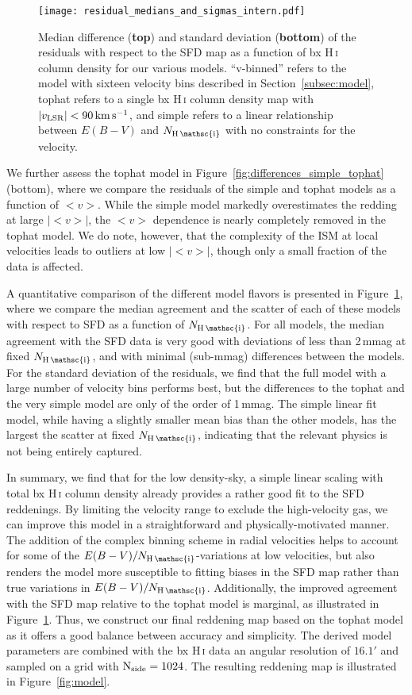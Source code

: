 \documentclass[iop,apj]{emulateapj}
\makeatletter
\def\testbx{bx}%
\DeclareRobustCommand{\ion}[2]{%
\relax\ifmmode
\ifx\testbx\f@series
{\mathbf{#1\,\mathsc{#2}}}\else
{\mathrm{#1\,\mathsc{#2}}}\fi
\else\textup{#1\,{\mdseries\textsc{#2}}}%
\fi}
\makeatother
\begin{document}
\begin{figure}[tp]
	\texttt{[image: residual\_medians\_and\_sigmas\_intern.pdf]}
	\caption{Median difference ({\bf top}) and standard deviation ({\bf bottom}) of the residuals with respect to the SFD map as a function of \ion{H}{i} column density for our various models. ``v-binned'' refers to the model with sixteen velocity bins described in Section~\ref{subsec:model}, tophat refers to a single \ion{H}{i} column density map with $|v_{\rm LSR}| < 90\,\rm km\,s^{-1}$, and simple refers to a linear relationship between $E(B-V)$ and $N_\ion{H}{i}$ with no constraints for the velocity.}
	\label{fig:residual_stddev_intern}
\end{figure}

We further assess the tophat model in Figure~\ref{fig:differences_simple_tophat} (bottom), where we compare the residuals of the simple and tophat models as a function of $<v>$. While the simple model markedly overestimates the redding at large $|<v>|$, the $<v>$ dependence is nearly completely removed in the tophat model. We do note, however, that the complexity of the ISM at local velocities leads to outliers at low $|<v>|$, though only a small fraction of the data is affected.

A quantitative comparison of the different model flavors is presented in Figure~\ref{fig:residual_stddev_intern}, where we compare the median agreement and the scatter of each of these models with respect to SFD as a function of $N_\ion{H}{i}$. For all models, the median agreement with the SFD data is very good with deviations of less than 2\,mmag at fixed $N_\ion{H}{i}$, and with minimal (sub-mmag) differences between the models. For the standard deviation of the residuals, we find that the full model with a large number of velocity bins performs best, but the differences to the tophat and the very simple model are only of the order of 1\,mmag. The simple linear fit model, while having a slightly smaller mean bias than the other models, has the largest the scatter at fixed $N_\ion{H}{i}$, indicating that the relevant physics is not being entirely captured.

In summary, we find that for the low density-sky, a simple linear scaling with total \ion{H}{i} column density already provides a rather good fit to the SFD reddenings. By limiting the velocity range to exclude the high-velocity gas, we can improve this model in a straightforward and physically-motivated manner. The addition of the complex binning scheme in radial velocities helps to account for some of the $E(B-V)/N_{\ion{H}{i}}$-variations at low velocities, but also renders the model more susceptible to fitting biases in the SFD map rather than true variations in $E(B-V)/N_{\ion{H}{i}}$. Additionally, the improved agreement with the SFD map relative to the tophat model is marginal, as illustrated in Figure~\ref{fig:residual_stddev_intern}. Thus, we construct our final reddening map based on the tophat model as it offers a good balance between accuracy and simplicity. The derived model parameters are combined with the \ion{H}{i} data an angular resolution of $16.1'$ and sampled on a grid with $\rm N_{side}=1024$. The resulting reddening map is illustrated in Figure~\ref{fig:model}.
\end{document}
